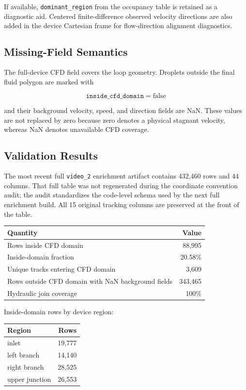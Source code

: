 If available, \texttt{dominant\_region} from the occupancy table is retained as
a diagnostic aid. Centered finite-difference observed velocity directions are
also added in the device Cartesian frame for flow-direction alignment
diagnostics.

\subsection{Missing-Field Semantics}

The full-device CFD field covers the loop geometry. Droplets outside the final
fluid polygon are marked with

\[
  \texttt{inside\_cfd\_domain} = \mathrm{false}
\]

and their background velocity, speed, and direction fields are NaN. These
values are not replaced by zero because zero denotes a physical stagnant
velocity, whereas NaN denotes unavailable CFD coverage.

\subsection{Validation Results}

The most recent full \texttt{video\_2} enrichment artifact contains 432,460 rows
and 44 columns.  That full table was not regenerated during the coordinate
convention audit; the audit standardizes the code-level schema used by the next
full enrichment build.  All 15 original tracking columns are preserved at the
front of the table.

\begin{center}
\begin{tabular}{lr}
\toprule
Quantity & Value \\
\midrule
Rows inside CFD domain & 88,995 \\
Inside-domain fraction & 20.58\% \\
Unique tracks entering CFD domain & 3,609 \\
Rows outside CFD domain with NaN background fields & 343,465 \\
Hydraulic join coverage & 100\% \\
\bottomrule
\end{tabular}
\end{center}

Inside-domain rows by device region:

\begin{center}
\begin{tabular}{lr}
\toprule
Region & Rows \\
\midrule
inlet & 19,777 \\
left branch & 14,140 \\
right branch & 28,525 \\
upper junction & 26,553 \\
\bottomrule
\end{tabular}
\end{center}

